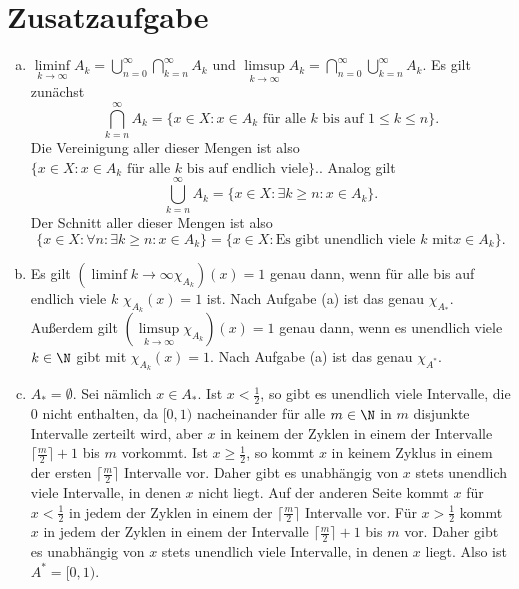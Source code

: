 \documentclass{article}
\begin{document}
    \section*{Zusatzaufgabe}
    \begin{enumerate}[(a)]
        \item $\liminf\limits_{k \to \infty} A_k = \bigcup_{n=0}^\infty \bigcap_{k=n}^\infty A_k$ und $\limsup\limits_{k \to \infty} A_k = \bigcap_{n=0}^\infty \bigcup_{k=n}^\infty A_k$.
        Es gilt zunächst \[\bigcap_{k=n}^\infty A_k = \{x \in X\colon x \in A_k\text{ für alle } k \text{ bis auf } 1 \leq k\leq n\}.\]
        Die Vereinigung aller dieser Mengen ist also $\{x \in X\colon x \in A_k\text{ für alle } k \text{ bis auf endlich viele}\}.$.
        Analog gilt \[\bigcup_{k=n}^\infty A_k = \{x \in X\colon \exists k \geq n\colon x \in A_k\}.\]
        Der Schnitt aller dieser Mengen ist also \[\{x \in X\colon \forall n\colon \exists k \geq n\colon x\in A_k\} = \{x \in X\colon \text{Es gibt unendlich viele $k$ mit} x\in A_k\}.\]
        \item Es gilt $(\liminf\limits{k \to \infty} \chi_{A_k})(x) = 1$ genau dann, wenn für alle bis auf endlich viele $k$ $\chi_{A_k}(x) = 1$ ist. Nach Aufgabe (a) ist das genau $\chi_{A_*}$. Außerdem gilt $(\limsup\limits_{k \to \infty} \chi_{A_k})(x) = 1$ genau dann, wenn es unendlich viele $k\in \N$ gibt mit $\chi_{A_k}(x) = 1$. Nach Aufgabe (a) ist das genau $\chi_{A^*}$.
        \item $A_* = \emptyset$. Sei nämlich $x \in A_*$. Ist $x < \frac{1}{2}$, so gibt es unendlich viele Intervalle, die 0 nicht enthalten, da $[0,1)$ nacheinander für alle $m\in \N$ in $m$ disjunkte Intervalle zerteilt wird, aber $x$ in keinem der Zyklen in einem der Intervalle $\lceil \frac{m}{2}\rceil +1$ bis $m$ vorkommt. Ist $x \geq \frac{1}{2}$, so kommt $x$ in keinem Zyklus in einem der ersten  $\lceil \frac{m}{2}\rceil$ Intervalle vor. Daher gibt es unabhängig von $x$ stets unendlich viele Intervalle, in denen $x$ nicht liegt. Auf der anderen Seite kommt $x$ für $x < \frac{1}{2}$ in jedem der Zyklen in einem der $\lceil \frac{m}{2}\rceil$ Intervalle vor. Für $x > \frac{1}{2}$ kommt $x$ in jedem der Zyklen in einem der Intervalle $\lceil \frac{m}{2}\rceil +1$ bis $m$ vor. Daher gibt es unabhängig von $x$ stets unendlich viele Intervalle, in denen $x$ liegt. Also ist $A^* = [0,1)$.
    \end{enumerate}
\end{document}
